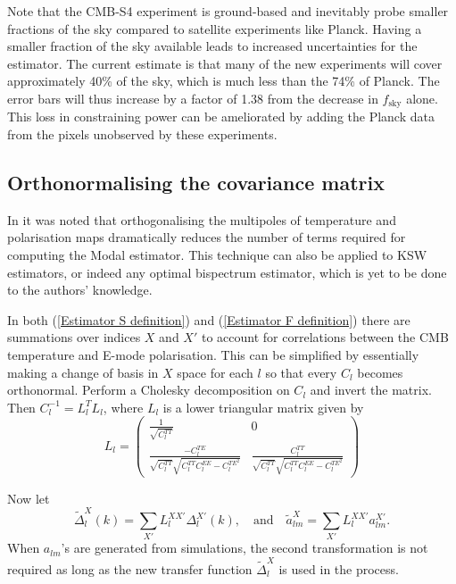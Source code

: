 Note that the CMB-S4 experiment is ground-based and inevitably probe smaller fractions of the sky compared to satellite experiments like Planck. Having a smaller fraction of the sky available leads to increased uncertainties for the estimator. The current estimate is that many of the new experiments will cover approximately 40\% of the sky, which is much less than the 74\% of Planck. The error bars will thus increase by a factor of 1.38 from the decrease in $f_\text{sky}$ alone.  This loss in constraining power can be ameliorated by adding the Planck data from the pixels unobserved by these experiments.

\subsection{Orthonormalising the covariance matrix}

In \cite{Fergusson2014} it was noted that orthogonalising the multipoles of temperature and polarisation maps dramatically reduces the number of terms required for computing the Modal estimator. This technique can also be applied to KSW estimators, or indeed any optimal bispectrum estimator, which is yet to be done to the authors' knowledge.

In both (\ref{Estimator S definition}) and (\ref{Estimator F definition}) there are summations over indices $X$ and $X'$ to account for correlations between the CMB temperature and E-mode polarisation. This can be simplified by essentially making a change of basis in $X$ space for each $l$ so that every $C_l$ becomes orthonormal. Perform a Cholesky decomposition on $C_l$ and invert the matrix. Then ${C_l^{-1} = L_l^T L_l}$, where $L_l$ is a lower triangular matrix given by
\begin{equation}
	L_l = \begin{pmatrix} \frac{1}{\sqrt{C_l^{TT}}} & 0  \\ \frac{- C_l^{TE}}{\sqrt{C_l^{TT}} \sqrt{C_l^{TT} C_l^{EE} - C_l^{TE^2}}}  &  \frac{ C_l^{TT}}{\sqrt{C_l^{TT}} \sqrt{C_l^{TT} C_l^{EE} - C_l^{TE^2}}} \end{pmatrix}
\end{equation}

Now let
\begin{equation}
	\tilde{\Delta}_{l}^X (k) = \sum_{X'} L_l^{XX'} \Delta_{l}^{X'} (k), \quad\text{and}\quad \tilde{a}_{lm}^X = \sum_{X'} L_l^{XX'} a_{lm}^{X'}.
	\label{orthonormalisation}
\end{equation}
When $a_{lm}$'s are generated from simulations, the second transformation is not required as long as the new transfer function $\tilde{\Delta}_l^X$ is used in the process.

